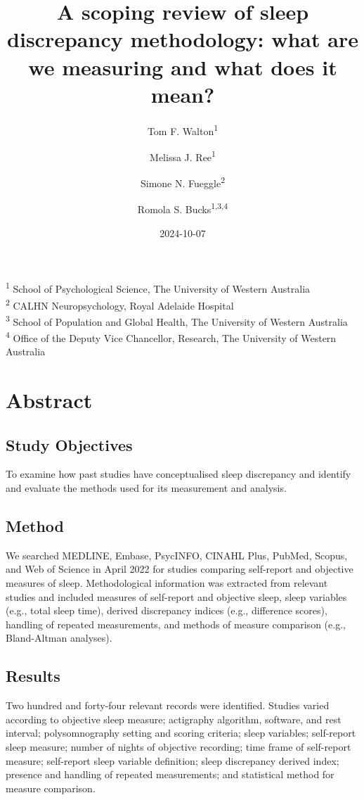 \documentclass[
]{article}
\title{A scoping review of sleep discrepancy methodology: what are we measuring and what does it mean?}
\author{Tom F. Walton\textsuperscript{1} \and Melissa J. Ree\textsuperscript{1} \and Simone N. Fueggle\textsuperscript{2} \and Romola S. Bucks\textsuperscript{1,3,4}}
\date{2024-10-07}
\begin{document}
\maketitle

\textsuperscript{1} School of Psychological Science, The University of Western Australia\\
\textsuperscript{2} CALHN Neuropsychology, Royal Adelaide Hospital\\
\textsuperscript{3} School of Population and Global Health, The University of Western Australia\\
\textsuperscript{4} Office of the Deputy Vice Chancellor, Research, The University of Western Australia

\section{Abstract}\label{abstract}

\subsection{Study Objectives}\label{study-objectives}

To examine how past studies have conceptualised sleep discrepancy and identify and evaluate the methods used for its measurement and analysis.

\subsection{Method}\label{method}

We searched MEDLINE, Embase, PsycINFO, CINAHL Plus, PubMed, Scopus, and Web of Science in April 2022 for studies comparing self-report and objective measures of sleep. Methodological information was extracted from relevant studies and included measures of self-report and objective sleep, sleep variables (e.g., total sleep time), derived discrepancy indices (e.g., difference scores), handling of repeated measurements, and methods of measure comparison (e.g., Bland-Altman analyses).

\subsection{Results}\label{results}

Two hundred and forty-four relevant records were identified. Studies varied according to objective sleep measure; actigraphy algorithm, software, and rest interval; polysomnography setting and scoring criteria; sleep variables; self-report sleep measure; number of nights of objective recording; time frame of self-report measure; self-report sleep variable definition; sleep discrepancy derived index; presence and handling of repeated measurements; and statistical method for measure comparison.
\end{document}
